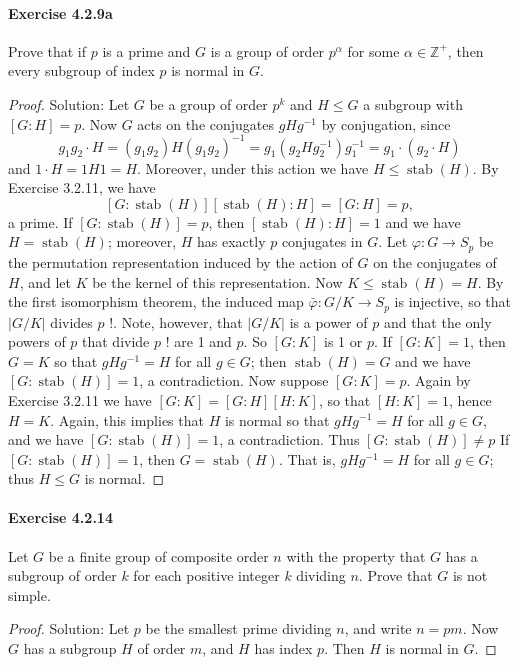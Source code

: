 \documentclass{article}
\theoremstyle{definition}
\begin{document}
\paragraph{Exercise 4.2.9a} Prove that if $p$ is a prime and $G$ is a group of order $p^{\alpha}$ for some $\alpha \in \mathbb{Z}^{+}$, then every subgroup of index $p$ is normal in $G$.
\begin{proof}
    Solution: Let $G$ be a group of order $p^k$ and $H \leq G$ a subgroup with $[G: H]=p$. Now $G$ acts on the conjugates $g H g^{-1}$ by conjugation, since
$$
g_1 g_2 \cdot H=\left(g_1 g_2\right) H\left(g_1 g_2\right)^{-1}=g_1\left(g_2 H g_2^{-1}\right) g_1^{-1}=g_1 \cdot\left(g_2 \cdot H\right)
$$
and $1 \cdot H=1 H 1=H$. Moreover, under this action we have $H \leq \operatorname{stab}(H)$. By Exercise 3.2.11, we have
$$
[G: \operatorname{stab}(H)][\operatorname{stab}(H): H]=[G: H]=p,
$$
a prime.
If $[G: \operatorname{stab}(H)]=p$, then $[\operatorname{stab}(H): H]=1$ and we have $H=\operatorname{stab}(H)$; moreover, $H$ has exactly $p$ conjugates in $G$. Let $\varphi: G \rightarrow S_p$ be the permutation representation induced by the action of $G$ on the conjugates of $H$, and let $K$ be the kernel of this representation. Now $K \leq \operatorname{stab}(H)=H$. By the first isomorphism theorem, the induced map $\bar{\varphi}: G / K \rightarrow S_p$ is injective, so that $|G / K|$ divides $p$ !. Note, however, that $|G / K|$ is a power of $p$ and that the only powers of $p$ that divide $p$ ! are 1 and $p$. So $[G: K]$ is 1 or $p$. If $[G: K]=1$, then $G=K$ so that $g H g^{-1}=H$ for all $g \in G$; then $\operatorname{stab}(H)=G$ and we have $[G: \operatorname{stab}(H)]=1$, a contradiction. Now suppose $[G: K]=p$. Again by Exercise $3.2$.11 we have $[G: K]=[G: H][H: K]$, so that $[H: K]=1$, hence $H=K$. Again, this implies that $H$ is normal so that $g H g^{-1}=H$ for all $g \in G$, and we have $[G: \operatorname{stab}(H)]=1$, a contradiction. Thus $[G: \operatorname{stab}(H)] \neq p$
If $[G: \operatorname{stab}(H)]=1$, then $G=\operatorname{stab}(H)$. That is, $g H g^{-1}=H$ for all $g \in G$; thus $H \leq G$ is normal.
\end{proof}



\paragraph{Exercise 4.2.14} Let $G$ be a finite group of composite order $n$ with the property that $G$ has a subgroup of order $k$ for each positive integer $k$ dividing $n$. Prove that $G$ is not simple.
\begin{proof}
    Solution: Let $p$ be the smallest prime dividing $n$, and write $n=p m$. Now $G$ has a subgroup $H$ of order $m$, and $H$ has index $p$. Then $H$ is normal in $G$.
\end{proof}
\end{document}
